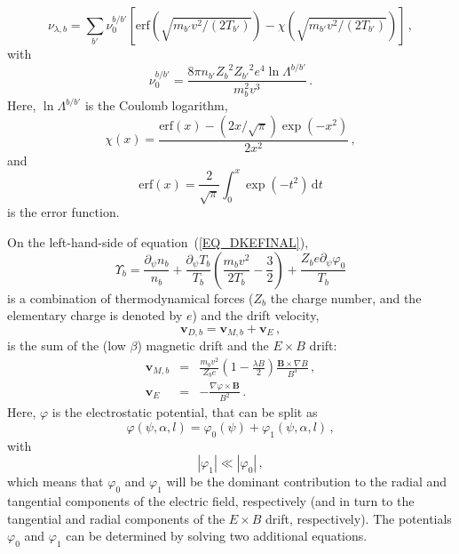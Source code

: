 \begin{equation}
\nu_{\lambda,b}=\sum_{b'}\nu_0^{b/b'}\left[\mbox{erf} \left(\sqrt{m_{b'} v^2 /(2T_{b'})}\right) - \chi \left(\sqrt{m_{b'} v^2 /(2T_{b'})} \right)\right]\,,
\end{equation}
with
\begin{equation}
\nu_0^{b/b'}= \frac{8\pi  n_{b'} {Z_b}^2{Z_{b'}}^2  e^4 \ln \Lambda^{b/b'}}{m_b^2 v^3} \,.
\end{equation}
Here, $\ln \Lambda^{b/b'}$ is the Coulomb logarithm, 
\begin{equation}
\chi (x) = \frac{\mbox{erf} (x) - (2 x/\sqrt{\pi})\exp(-x^2)}{2x^2}\,,
\end{equation}
and
\begin{equation}
\mbox{erf}(x) = \frac{2}{\sqrt{\pi}} \int_0^x \exp (- t^2)\, \mathrm{d} t
\end{equation}
is the error function.

On the left-hand-side of equation~(\ref{EQ_DKEFINAL}), 
\begin{equation}
\Upsilon_b = \frac{\partial_\psi n_b}{n_b} + \frac{\partial_\psi T_b}{T_b}\left(\frac{m_bv^2}{2T_b}-\frac{3}{2}\right)+\frac{Z_be\partial_\psi\varphi_0}{T_b}
\end{equation}
is a combination of thermodynamical forces ($Z_b$ the charge number, and the elementary charge is denoted by $e$) and the drift velocity,
\begin{equation}
\mathbf{v}_{D,b} = \mathbf{v}_{M,b}+\mathbf{v}_E\,,
\end{equation}
is the sum of the (low $\beta$) magnetic drift and the $E\times B$ drift:
\begin{eqnarray}
\mathbf{v}_{M,b} &=& \frac{m_bv^2}{Z_be}\left(1-\frac{\lambda B}{2}\right)\frac{\mathbf{B}\times\nabla B}{B^3}\,,\nonumber\\
\mathbf{v}_E &=& -\frac{\nabla\varphi\times\mathbf{B}}{B^2}\,.
\end{eqnarray}
Here, $\varphi$ is the electrostatic potential, that can be split as
\begin{equation}
\varphi(\psi,\alpha,l)=\varphi_0(\psi)+\varphi_1(\psi,\alpha,l)\,,
\end{equation}
with
\begin{equation}
|\varphi_1|\ll|\varphi_0|\,,
\end{equation}
which means that $\varphi_0$ and $\varphi_1$ will be the dominant contribution to the radial and tangential components of the electric field, respectively (and in turn to the tangential and radial components of the $E\times B$ drift, respectively). The potentials $\varphi_0$ and $\varphi_1$ can be determined by solving two additional equations.

